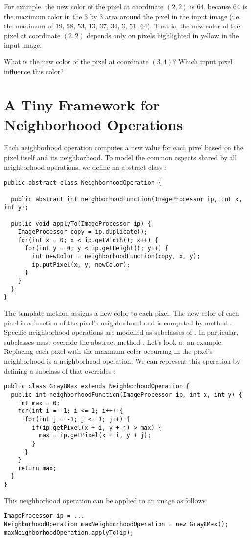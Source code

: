 \documentclass{book}
\begin{document}
For example, the new color of the pixel at coordinate $(2, 2)$ is $64$, because $64$ is the maximum color in the 3 by 3 area around the pixel in the input image (i.e. the maximum of $19$, $58$, $53$, $13$, $37$, $34$, $3$, $51$, $64$). That is, the new color of the pixel at coordinate $(2, 2)$ depends only on pixels highlighted in yellow in the input image.

\begin{exercise}
What is the new color of the pixel at coordinate $(3, 4)$? Which input pixel influence this color?
\end{exercise}

\section{A Tiny Framework for Neighborhood Operations}
Each neighborhood operation computes a new value for each pixel based on the pixel itself and its neighborhood. To model the common aspects shared by all neighborhood operations, we define an abstract class :
\begin{lstlisting}
public abstract class NeighborhoodOperation {

  public abstract int neighborhoodFunction(ImageProcessor ip, int x, int y);

  public void applyTo(ImageProcessor ip) {
    ImageProcessor copy = ip.duplicate();
    for(int x = 0; x < ip.getWidth(); x++) {
      for(int y = 0; y < ip.getHeight(); y++) {
        int newColor = neighborhoodFunction(copy, x, y);
        ip.putPixel(x, y, newColor);     
      }    
    }  
  }
}
\end{lstlisting}
The template method  assigns a new color to each pixel. The new color of each pixel is a function of the pixel's neighborhood and is computed by method .  Specific neighborhood operations are modelled as subclasses of . In particular, subclasses must override the abstract method . Let's look at an example. Replacing each pixel with the maximum color occurring in the pixel's neighborhood is a neighborhood operation. We can represent this operation by defining a subclass of  that overrides :
\begin{lstlisting}
public class Gray8Max extends NeighborhoodOperation {
  public int neighborhoodFunction(ImageProcessor ip, int x, int y) {
    int max = 0;
    for(int i = -1; i <= 1; i++) {
      for(int j = -1; j <= 1; j++) {
        if(ip.getPixel(x + i, y + j) > max) {
          max = ip.getPixel(x + i, y + j);          
        }
      }      
    }
    return max;
  }
}
\end{lstlisting}
This neighborhood operation can be applied to an image as follows:
\begin{lstlisting}
ImageProcessor ip = ...
NeighborhoodOperation maxNeighborhoodOperation = new Gray8Max();
maxNeighborhoodOperation.applyTo(ip);
\end{lstlisting}
\end{document}
